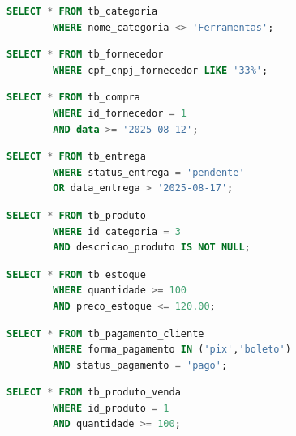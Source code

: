 \documentclass[
12pt,
a4paper,
semrecuonosumario,
sumario = abnt-6027-2012]{report}
\begin{document}
    \begin{lstlisting}[language=SQL,caption={SELECT -- Tabela \texttt{tb\_categoria}}]
        SELECT * FROM tb_categoria
        WHERE nome_categoria <> 'Ferramentas';
    \end{lstlisting}

    \begin{lstlisting}[language=SQL,caption={SELECT -- Tabela \texttt{tb\_fornecedor}}]
        SELECT * FROM tb_fornecedor
        WHERE cpf_cnpj_fornecedor LIKE '33%';
    \end{lstlisting}

    \begin{lstlisting}[language=SQL,caption={SELECT -- Tabela \texttt{tb\_compra}}]
        SELECT * FROM tb_compra
        WHERE id_fornecedor = 1
        AND data >= '2025-08-12';
    \end{lstlisting}

    \begin{lstlisting}[language=SQL,caption={SELECT -- Tabela \texttt{tb\_entrega}}]
        SELECT * FROM tb_entrega
        WHERE status_entrega = 'pendente'
        OR data_entrega > '2025-08-17';
    \end{lstlisting}

    \begin{lstlisting}[language=SQL,caption={SELECT -- Tabela \texttt{tb\_produto}}]
        SELECT * FROM tb_produto
        WHERE id_categoria = 3
        AND descricao_produto IS NOT NULL;
    \end{lstlisting}

    \begin{lstlisting}[language=SQL,caption={SELECT -- Tabela \texttt{tb\_estoque}}]
        SELECT * FROM tb_estoque
        WHERE quantidade >= 100
        AND preco_estoque <= 120.00;
    \end{lstlisting}

    \begin{lstlisting}[language=SQL,caption={SELECT -- Tabela \texttt{tb\_pagamento\_cliente}}]
        SELECT * FROM tb_pagamento_cliente
        WHERE forma_pagamento IN ('pix','boleto')
        AND status_pagamento = 'pago';
    \end{lstlisting}

    \begin{lstlisting}[language=SQL,caption={SELECT -- Tabela \texttt{tb\_produto\_venda}}]
        SELECT * FROM tb_produto_venda
        WHERE id_produto = 1
        AND quantidade >= 100;
    \end{lstlisting}
\end{document}
